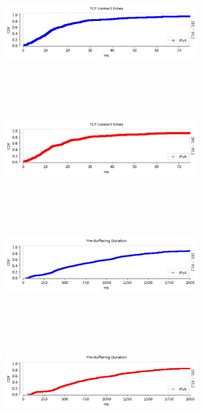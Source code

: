\begin{figure}
	\centering
	\begin{minipage}{0.5\textwidth}
		\centering
		\includegraphics[keepaspectratio, height=5cm, width=8.5cm]{figures/tcp/netflix-syn-time-absolute-difference-v4.pdf}
	\end{minipage}
	\begin{minipage}{0.5\textwidth}
		\centering
		\includegraphics[keepaspectratio, height=5cm, width=8.5cm]{figures/tcp/netflix-syn-time-absolute-difference-v6.pdf}
	\end{minipage}
	\begin{minipage}{0.5\textwidth}
		\centering
		\includegraphics[keepaspectratio, height=5cm, width=8.5cm]{figures/tcp/netflix-prebuffering-duration-absolute-difference-v4.pdf}
	\end{minipage}
	\begin{minipage}{0.5\textwidth}
		\centering
		\includegraphics[keepaspectratio, height=5cm, width=8.5cm]{figures/tcp/netflix-prebuffering-duration-absolute-difference-v6.pdf}

\end{minipage}
\end{figure}
